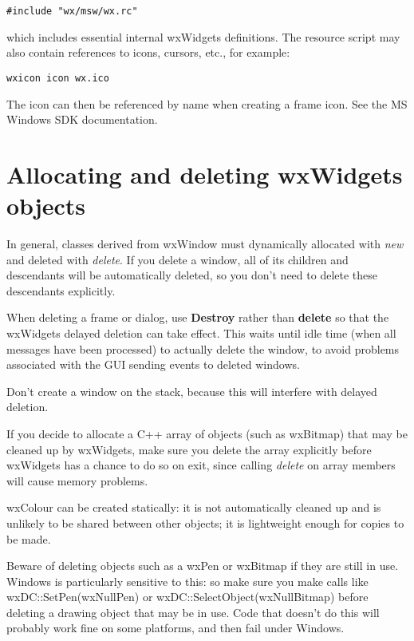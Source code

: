 \begin{verbatim}
#include "wx/msw/wx.rc"
\end{verbatim}

which includes essential internal wxWidgets definitions.  The resource script
may also contain references to icons, cursors, etc., for example:

\begin{verbatim}
wxicon icon wx.ico
\end{verbatim}

The icon can then be referenced by name when creating a frame icon. See
the MS Windows SDK documentation.


\section{Allocating and deleting wxWidgets objects}\label{allocatingobjects}

In general, classes derived from wxWindow must dynamically allocated
with {\it new} and deleted with {\it delete}. If you delete a window,
all of its children and descendants will be automatically deleted,
so you don't need to delete these descendants explicitly.

When deleting a frame or dialog, use {\bf Destroy} rather than {\bf delete} so
that the wxWidgets delayed deletion can take effect. This waits until idle time
(when all messages have been processed) to actually delete the window, to avoid
problems associated with the GUI sending events to deleted windows.

Don't create a window on the stack, because this will interfere
with delayed deletion.

If you decide to allocate a C++ array of objects (such as wxBitmap) that may
be cleaned up by wxWidgets, make sure you delete the array explicitly
before wxWidgets has a chance to do so on exit, since calling {\it delete} on
array members will cause memory problems.

wxColour can be created statically: it is not automatically cleaned
up and is unlikely to be shared between other objects; it is lightweight
enough for copies to be made.

Beware of deleting objects such as a wxPen or wxBitmap if they are still in use.
Windows is particularly sensitive to this: so make sure you
make calls like wxDC::SetPen(wxNullPen) or wxDC::SelectObject(wxNullBitmap) before deleting
a drawing object that may be in use. Code that doesn't do this will probably work
fine on some platforms, and then fail under Windows.

